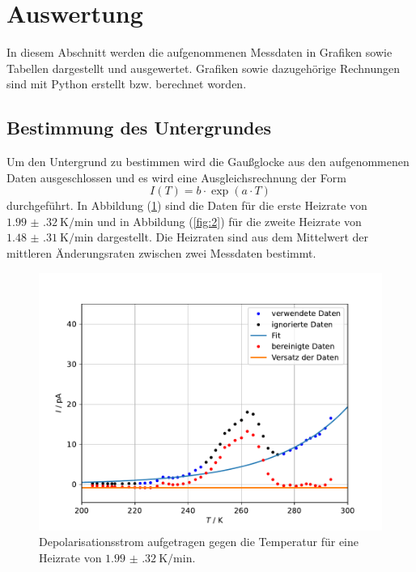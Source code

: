 
\section{Auswertung}
\label{sec:Auswertung}
In diesem Abschnitt werden die aufgenommenen Messdaten in Grafiken sowie Tabellen dargestellt und ausgewertet. Grafiken sowie dazugehörige Rechnungen sind mit Python \cite{python} erstellt bzw. berechnet worden.
\subsection{Bestimmung des Untergrundes}
\label{sec:unter}
Um den Untergrund zu bestimmen wird die Gaußglocke aus den aufgenommenen Daten ausgeschlossen und es wird eine Ausgleichsrechnung der Form
\begin{equation*}
  I(T)=b\cdot\exp\left(a\cdot T \right)
\end{equation*}
durchgeführt. In Abbildung (\ref{fig:1}) sind die Daten für die erste Heizrate von $\SI{1.99(32)}{\kelvin\per\minute}$ und in Abbildung (\ref{fig:2}) für die zweite Heizrate von $\SI{1.48(31)}{\kelvin\per\minute}$ dargestellt. Die Heizraten sind aus dem Mittelwert der mittleren Änderungsraten zwischen zwei Messdaten bestimmt.
\begin{figure}[h!]
  \centering
  \includegraphics[scale=0.8]{fig/plot1.pdf}
  \caption{Depolarisationsstrom aufgetragen gegen die Temperatur für eine Heizrate von $\SI{1.99(32)}{\kelvin\per\minute}$.}
  \label{fig:1}
\end{figure}
